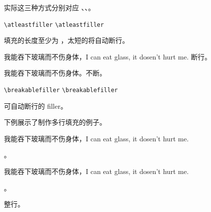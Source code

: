 \documentclass[twoside]{book}
\def\xampletext{\par}
\def\xampleprint{\xamplecode \xampleline \xampletext}
\begin{document}
\begin{texnote}
实际这三种方式分别对应 、、。
\end{texnote}

\begin{function}{\atleastfiller}
  \begin{syntax}
    \verb|\atleastfiller| 
    \verb|\atleastfiller|  
  \end{syntax}
填充的长度至少为 ，太短的将自动断行。
\end{function}

\begin{xample}
我能吞下玻璃而不伤身体，I can eat glass, it dosen't hurt me.%
\atleastfiller[cdotted=1em]{5cm}断行。

我能吞下玻璃而不伤身体。\atleastfiller[cdotted=1em]{5cm}不断。
\stopxamplecode
\xampleprint 
\end{xample}

\begin{function}{\breakablefiller}
  \begin{syntax}
    \verb|\breakablefiller|
    \verb|\breakablefiller| 
  \end{syntax}
可自动断行的 filler。
\end{function}

\begin{xample}
 \breakablefiller[cdotted=1em] 

 \breakablefiller[cdotted=1em] 
\stopxamplecode
\xampleprint
\end{xample}

下例展示了制作多行填充的例子。
\begin{xample}
\newcommand\filllines[4][]{{%
  #2\filler[#1]%
  \Replicate{#3-1}{\break \rule{0pt}{0.7\baselineskip}\filler[#1]}%
  #4\par}}

我能吞下玻璃而不伤身体，I can eat glass, it dosen't hurt me.
\filllines{\linespread{2}\selectfont}{3}{。\hspace*{1em}}

我能吞下玻璃而不伤身体，I can eat glass, it dosen't hurt me.
\filllines[color=red,dotted]{\linespread{2}\selectfont}{3}{。\hspace*{1em}}

\filllines [raise=-.5ex]{\linespread{2}\selectfont \noindent\strut}{3}{ 整行。\hspace*{1em}}
\stopxamplecode
\xampleprint  
\end{xample}
\end{document}
